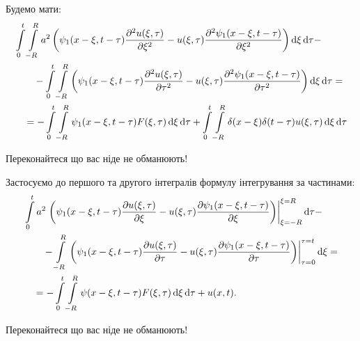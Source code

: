 Будемо мати:
\begin{equation}
	\begin{aligned}
		& \Int_0^t \Int_{-R}^R a^2 \left( \psi_1(x - \xi, t - \tau) \frac{\partial^2 u(\xi, \tau)}{\partial \xi^2} - u(\xi, \tau) \frac{\partial^2 \psi_1(x - \xi, t - \tau)}{\partial \xi^2}\right) \diff \xi \diff \tau - \\
		& \qquad - \Int_0^t \Int_{-R}^R \left( \psi_1(x - \xi, t - \tau) \frac{\partial^2 u(\xi, \tau)}{\partial \tau^2} - u(\xi, \tau) \frac{\partial^2 \psi_1(x - \xi, t - \tau)}{\partial \tau^2}\right) \diff \xi \diff \tau = \\
		& \quad = - \Int_0^t \Int_{-R}^R \psi_1(x - \xi, t - \tau) F(\xi, \tau) \diff \xi \diff \tau + \Int_0^t \Int_{-R}^R \delta(x - \xi) \delta(t - \tau) u(\xi, \tau) \diff \xi \diff \tau
	\end{aligned}
\end{equation}

\begin{exercise}
	Переконайтеся що вас ніде не обманюють!
\end{exercise}

Застосуємо до першого та другого інтегралів формулу інтегрування за частинами:
\begin{equation}
	\begin{aligned}
		& \displaystyle\int\limits_0^t a^2 \left. \left( \psi_1(x - \xi, t - \tau) \frac{\partial u(\xi, \tau)}{\partial \xi} - u(\xi, \tau) \frac{\partial \psi_1(x - \xi, t - \tau)}{\partial \xi}\right) \right|_{\xi = -R}^{\xi = R} \mathop{}\!\mathrm{d} \tau - \\
		& \qquad - \displaystyle\int\limits_{-R}^R \left. \left( \psi_1(x - \xi, t - \tau) \frac{\partial u(\xi, \tau)}{\partial \tau} - u(\xi, \tau) \frac{\partial \psi_1(x - \xi, t - \tau)}{\partial \tau}\right) \right|_{\tau = 0}^{\tau = t} \mathop{}\!\mathrm{d} \xi = \\
		& \quad = - \displaystyle\int\limits_0^t \displaystyle\int\limits_{-R}^R \psi(x - \xi, t - \tau) F(\xi, \tau) \mathop{}\!\mathrm{d} \xi \mathop{}\!\mathrm{d} \tau + u(x, t).
	\end{aligned}
\end{equation}

\begin{exercise}
	Переконайтеся що вас ніде не обманюють!
\end{exercise}

